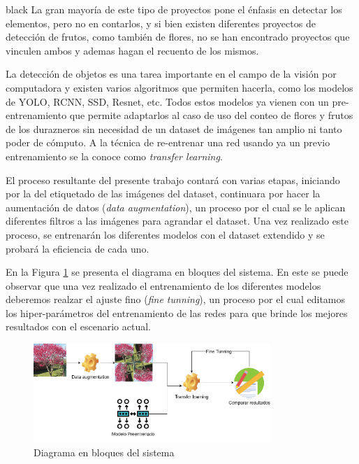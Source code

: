 \documentclass[
11pt, %
]{charter}
\begin{document}
\begin{consigna}{black}
La gran mayoría de este tipo de proyectos pone el énfasis en detectar los elementos, pero no en contarlos, y si bien existen diferentes proyectos de detección de frutos, como también de flores, no se han encontrado proyectos que vinculen ambos y ademas hagan el recuento de los mismos.

La detección de objetos es una tarea importante en el campo de la visión por computadora y existen varios algoritmos que permiten hacerla, como los modelos de YOLO, RCNN, SSD, Resnet, etc. Todos estos modelos ya vienen con un pre-entrenamiento que permite adaptarlos al caso de uso del conteo de flores y frutos de los durazneros sin necesidad de un dataset de imágenes tan amplio ni tanto poder de cómputo. A la técnica de re-entrenar una red usando ya un previo entrenamiento se la conoce como \textit{transfer learning}.

El proceso resultante del presente trabajo contará con varias etapas, iniciando por la del etiquetado de las imágenes del dataset, continuara por hacer la aumentación de datos (\textit{data augmentation}), un proceso por el cual se le aplican diferentes filtros a las imágenes para agrandar el dataset. Una vez realizado este proceso,  se entrenarán los diferentes modelos con el dataset extendido y se probará la eficiencia de cada uno. 

En la Figura \ref{fig:diagBloques} se presenta el diagrama en bloques del sistema. En este se puede observar que una vez realizado el entrenamiento de los diferentes modelos deberemos realzar el ajuste fino (\textit{fine tunning}), un proceso por el cual editamos los hiper-parámetros del entrenamiento de las redes para que brinde los mejores resultados con el escenario actual.

\begin{figure}[htpb]
\centering 
\includegraphics[width=0.80\textwidth]{./Figuras/Diagrama entrenamiento.png}
\caption{Diagrama en bloques del sistema}
\label{fig:diagBloques}
\end{figure}

\vspace{25px}


\end{consigna}
\end{document}
